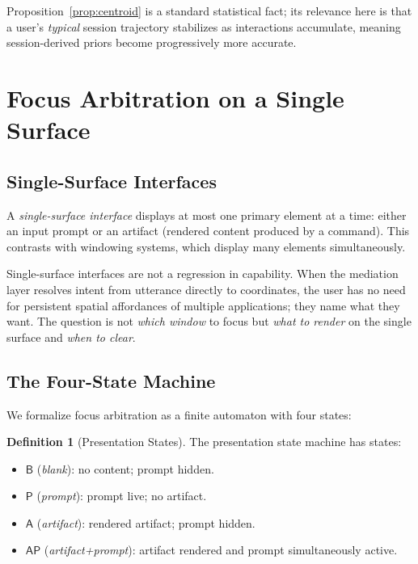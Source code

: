 \documentclass[11pt,a4paper]{article}
\theoremstyle{definition}
\newtheorem{definition}[theorem]{Definition}
\theoremstyle{remark}
\begin{document}
Proposition~\ref{prop:centroid} is a standard statistical fact; its relevance here is that a user's \emph{typical} session trajectory stabilizes as interactions accumulate, meaning session-derived priors become progressively more accurate.

\section{Focus Arbitration on a Single Surface}
\label{sec:focus}

\subsection{Single-Surface Interfaces}

A \emph{single-surface interface} displays at most one primary element at a time: either an input prompt or an artifact (rendered content produced by a command). This contrasts with windowing systems, which display many elements simultaneously.

Single-surface interfaces are not a regression in capability. When the mediation layer resolves intent from utterance directly to coordinates, the user has no need for persistent spatial affordances of multiple applications; they name what they want. The question is not \emph{which window} to focus but \emph{what to render} on the single surface and \emph{when to clear}.

\subsection{The Four-State Machine}

We formalize focus arbitration as a finite automaton with four states:

\begin{definition}[Presentation States]
\label{def:states}
The presentation state machine has states:
\begin{itemize}
    \item $\mathsf{B}$ (\emph{blank}): no content; prompt hidden.
    \item $\mathsf{P}$ (\emph{prompt}): prompt live; no artifact.
    \item $\mathsf{A}$ (\emph{artifact}): rendered artifact; prompt hidden.
    \item $\mathsf{AP}$ (\emph{artifact+prompt}): artifact rendered and prompt simultaneously active.
\end{itemize}
\end{definition}
\end{document}
